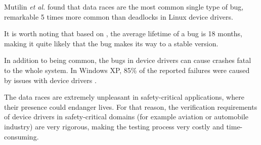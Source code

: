 \documentclass[..thesis.tex]{subfiles}
\begin{document}
Mutilin \textit{et al.} \cite{mutilin_analysis_2012} found that data races are the most common single type of bug, remarkable 5 times more common than deadlocks in Linux device drivers.

It is worth noting that based on \cite{chou_empirical_2001,palix_faults_2011}, the average lifetime of a bug is 18 months, making it quite likely that the bug makes its way to a stable version. 


In addition to being common, the bugs in device drivers can cause crashes fatal to the whole system. In Windows XP, 85\% of the reported failures were caused by issues with device drivers \cite{swift_improving_2003}.

The data races are extremely unpleasant in safety-critical applications, where their presence could endanger lives. For that reason, the verification requirements of device drivers in safety-critical domains (for example aviation or automobile industry) are very rigorous, making the testing process very costly and time-consuming.






\end{document}
